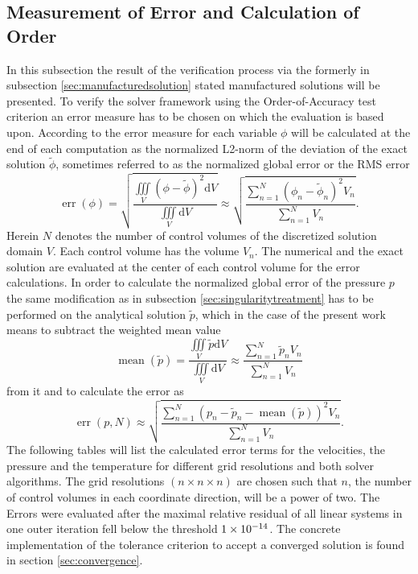\subsection{Measurement of Error and Calculation of Order}

In this subsection the result of the verification process via the formerly in subsection \ref{sec:manufacturedsolution} stated manufactured solutions will be presented. To verify the solver framework using the Order-of-Accuracy test criterion an error measure has to be chosen on which the evaluation is based upon. According to \cite{salari00} the error measure for each variable \(\phi\) will be calculated at the end of each computation as the normalized L2-norm of the deviation of the exact solution \(\tilde{\phi}\), sometimes referred to as the normalized global error or the RMS error
\begin{displaymath}
  \operatorname{err}(\phi) = \sqrt{ \frac {\iiint\limits_V \left( \phi - \tilde{\phi} \right)^2 \mathrm{d}V }{\iiint\limits_V \mathrm{d}V }} \approx \sqrt{ \frac{ \sum_{n=1}^N \left(\phi_n - \tilde{\phi}_n \right)^2 V_n }{\sum_{n=1}^{N} V_n}} .
\end{displaymath}
Herein \(N\) denotes the number of control volumes of the discretized solution domain \(V\). Each control volume has the volume \(V_n\). The numerical and the exact solution are evaluated at the center of each control volume for the error calculations. In order to calculate the normalized global error of the pressure \(p\) the same modification as in subsection \ref{sec:singularitytreatment} has to be performed on the analytical solution \(\tilde{p}\), which in the case of the present work means to subtract the weighted mean value
\begin{displaymath}
  \operatorname{mean}\left( \tilde{p} \right) = \frac{\iiint\limits_V \tilde{p} \mathrm{d}V}{\iiint\limits_V \mathrm{d}V} \approx \frac{\sum_{n=1}^N \tilde{p}_n V_n}{\sum_{n=1}^N V_n}
\end{displaymath}
from it and to calculate the error as
\begin{displaymath}
  \operatorname{err}(p,N) \approx \sqrt{ \frac{ \sum_{n=1}^N \left(p_n - \tilde{p}_n -\operatorname{mean}\left(\tilde{p}\right) \right)^2 V_n }{\sum_{n=1}^{N} V_n}} .
\end{displaymath}
The following tables will list the calculated error terms for the velocities, the pressure and the temperature for different grid resolutions and both solver algorithms. The grid resolutions \((n \times n \times n)\) are chosen such that \(n\), the number of control volumes in each coordinate direction, will be a power of two. The Errors were evaluated after the maximal relative residual of all linear systems in one outer iteration fell below the threshold \(1\times 10^{-14}\). The concrete implementation of the tolerance criterion to accept a converged solution is found in section \ref{sec:convergence}.

